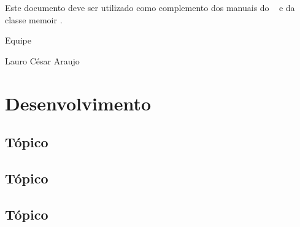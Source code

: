 \documentclass[
	12pt,				%
	openright,			%
	twoside,			%
	a4paper,			%
	english,			%
	french,				%
	spanish,			%
	brazil,				%
	]{abntex2}
\begin{document}
Este documento deve ser utilizado como complemento dos manuais do \abnTeX\ 
\cite{abntex2classe,abntex2cite,abntex2cite-alf} e da classe \textsf{memoir}
\cite{memoir}. 

Equipe \abnTeX 

Lauro César Araujo

\chapter{Desenvolvimento}
\section{Tópico}
\section{Tópico}
\section{Tópico}











\end{document}
